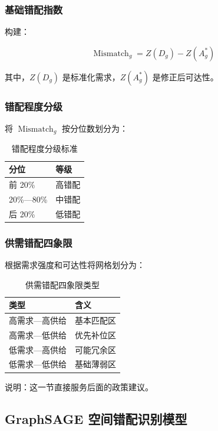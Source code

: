 \subsubsection{基础错配指数}

构建：

\begin{equation}
\operatorname{Mismatch}_g = Z(D_g) - Z(A_g^{*})
\end{equation}

其中，$Z(D_g)$ 是标准化需求，$Z(A_g^{*})$ 是修正后可达性。

\subsubsection{错配程度分级}

将 $\operatorname{Mismatch}_g$ 按分位数划分为：

\begin{table}[H]
\centering
\caption{错配程度分级标准}
\begin{tabular}{ll}
\toprule
\rowcolor{tablehead}
分位 & 等级 \\
\midrule
前 20\% & 高错配 \\
20\%—80\% & 中错配 \\
后 20\% & 低错配 \\
\bottomrule
\end{tabular}
\end{table}

\subsubsection{供需错配四象限}

根据需求强度和可达性将网格划分为：

\begin{table}[H]
\centering
\caption{供需错配四象限类型}
\begin{tabular}{ll}
\toprule
\rowcolor{tablehead}
类型 & 含义 \\
\midrule
高需求—高供给 & 基本匹配区 \\
高需求—低供给 & 优先补位区 \\
低需求—高供给 & 可能冗余区 \\
低需求—低供给 & 基础薄弱区 \\
\bottomrule
\end{tabular}
\end{table}

说明：这一节直接服务后面的政策建议。

\subsection{GraphSAGE 空间错配识别模型}

